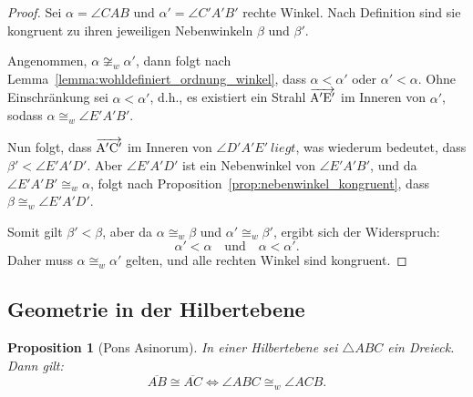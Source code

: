 \documentclass[a4paper,12pt]{article}
\theoremstyle{break}
\newtheorem{proposition}[definition]{Proposition}
\begin{document}
\begin{proof}
Sei \(\alpha = \angle CAB\) und \(\alpha' = \angle C'A'B'\) rechte Winkel. Nach Definition sind sie kongruent zu ihren jeweiligen Nebenwinkeln \(\beta\) und \(\beta'\).

Angenommen, \(\alpha \not\cong_w \alpha'\), dann folgt nach Lemma~\ref{lemma:wohldefiniert_ordnung_winkel}, dass \(\alpha < \alpha'\) oder \(\alpha' < \alpha\). Ohne Einschränkung sei \(\alpha < \alpha'\), d.h., es existiert ein Strahl \(\overrightarrow{\rm A'E'}\) im Inneren von \(\alpha'\), sodass \(\alpha \cong_w \angle E'A'B'\).

Nun folgt, dass \(\overrightarrow{\rm A'C'}\) im Inneren von \(\angle D'A'E'\ liegt\), was wiederum bedeutet, dass \(\beta' < \angle E'A'D'\). Aber \(\angle E'A'D'\) ist ein Nebenwinkel von \(\angle E'A'B'\), und da \(\angle E'A'B' \cong_w \alpha\), folgt nach Proposition~\ref{prop:nebenwinkel_kongruent}, dass \(\beta \cong_w \angle E'A'D'\).

Somit gilt \(\beta' < \beta\), aber da \(\alpha \cong_w \beta\) und \(\alpha' \cong_w \beta'\), ergibt sich der Widerspruch:
\[
\alpha' < \alpha \quad \text{und} \quad \alpha < \alpha'.
\]
Daher muss \(\alpha \cong_w \alpha'\) gelten, und alle rechten Winkel sind kongruent.
\end{proof}

\subsection{Geometrie in der Hilbertebene}
\begin{proposition}[Pons Asinorum]\label{prop:pons_asinorum}
In einer Hilbertebene sei \(\triangle ABC\) ein Dreieck. Dann gilt:
\[
\overline{AB} \cong \overline{AC} \iff \angle ABC \cong_w \angle ACB.
\]
\end{proposition}
\end{document}
